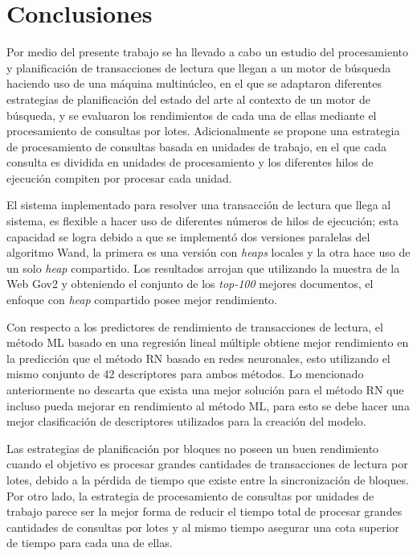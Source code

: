 \chapter{Conclusiones}
\label{cap:conclu}
Por medio del presente trabajo se ha llevado a cabo un estudio del procesamiento y planificación de transacciones de lectura que llegan a un motor de búsqueda haciendo uso de una máquina multinúcleo, en el que se adaptaron diferentes estrategias de planificación del estado del arte al contexto de un motor de búsqueda, y se evaluaron los rendimientos de cada una de ellas mediante el procesamiento de consultas por lotes. Adicionalmente se propone una estrategia de procesamiento de consultas basada en unidades de trabajo, en el que cada consulta es dividida en unidades de procesamiento y los diferentes hilos de ejecución compiten por procesar cada unidad.

El sistema implementado para resolver una transacción de lectura que llega al sistema, es flexible a hacer uso de diferentes números de hilos de ejecución; esta capacidad se logra debido a que se implementó dos versiones paralelas del algoritmo Wand, la primera es una versión con \textit{heaps} locales y la otra hace uso de un solo \textit{heap} compartido. Los resultados arrojan que utilizando la muestra de la Web Gov2 y obteniendo el conjunto de los \textit{top-100} mejores documentos, el enfoque con \textit{heap} compartido posee mejor rendimiento. 

Con respecto a los predictores de rendimiento de transacciones de lectura, el método ML basado en una regresión lineal múltiple obtiene mejor rendimiento en la predicción que el método RN basado en redes neuronales, esto utilizando el mismo conjunto de 42 descriptores para ambos métodos. Lo mencionado anteriormente no descarta que exista una mejor solución para el método RN que incluso pueda mejorar en rendimiento al método ML, para esto se debe hacer una mejor clasificación de descriptores utilizados para la creación del modelo.
 
Las estrategias de planificación por bloques no poseen un buen rendimiento cuando el objetivo es procesar grandes cantidades de transacciones de lectura por lotes, debido a la pérdida de tiempo que existe entre la sincronización de bloques. Por otro lado, la estrategia de procesamiento de consultas por unidades de trabajo parece ser la mejor forma de reducir el tiempo total de procesar grandes cantidades de consultas por lotes y al mismo tiempo asegurar una cota superior de tiempo para cada una de ellas.

